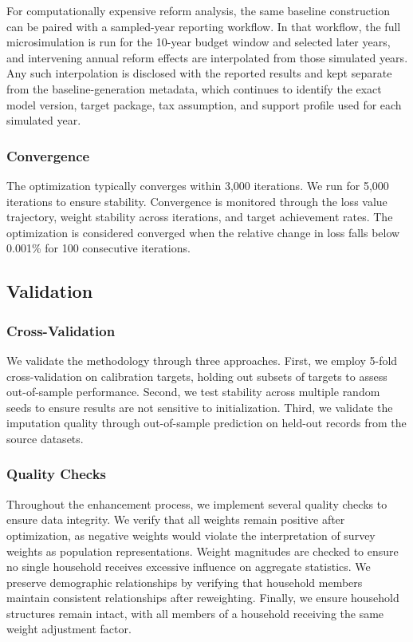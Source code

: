 For computationally expensive reform analysis, the same baseline construction can be paired with a sampled-year reporting workflow. In that workflow, the full microsimulation is run for the 10-year budget window and selected later years, and intervening annual reform effects are interpolated from those simulated years. Any such interpolation is disclosed with the reported results and kept separate from the baseline-generation metadata, which continues to identify the exact model version, target package, tax assumption, and support profile used for each simulated year.

\subsubsection{Convergence}

The optimization typically converges within 3,000 iterations. We run for 5,000 iterations to ensure stability. Convergence is monitored through the loss value trajectory, weight stability across iterations, and target achievement rates. The optimization is considered converged when the relative change in loss falls below 0.001\% for 100 consecutive iterations.

\subsection{Validation}

\subsubsection{Cross-Validation}

We validate the methodology through three approaches. First, we employ 5-fold cross-validation on calibration targets, holding out subsets of targets to assess out-of-sample performance. Second, we test stability across multiple random seeds to ensure results are not sensitive to initialization. Third, we validate the imputation quality through out-of-sample prediction on held-out records from the source datasets.

\subsubsection{Quality Checks}

Throughout the enhancement process, we implement several quality checks to ensure data integrity. We verify that all weights remain positive after optimization, as negative weights would violate the interpretation of survey weights as population representations. Weight magnitudes are checked to ensure no single household receives excessive influence on aggregate statistics. We preserve demographic relationships by verifying that household members maintain consistent relationships after reweighting. Finally, we ensure household structures remain intact, with all members of a household receiving the same weight adjustment factor.

